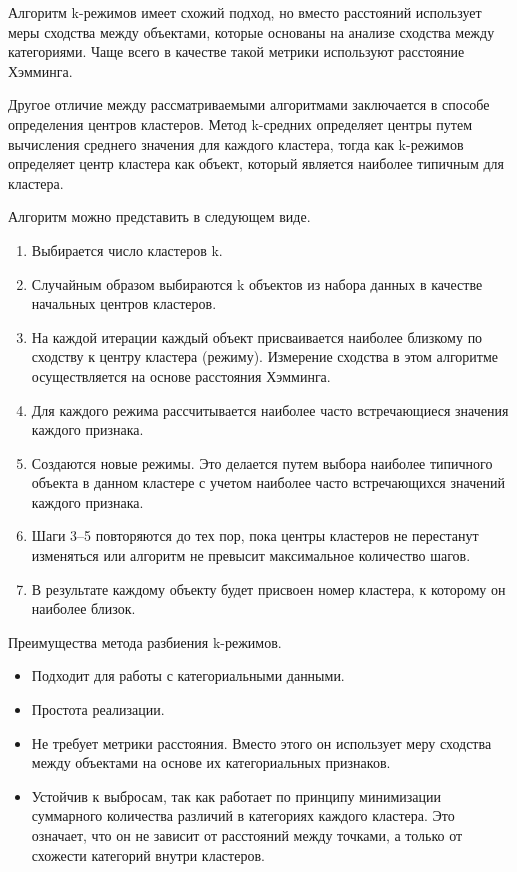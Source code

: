 Алгоритм k-режимов имеет схожий подход, но вместо расстояний использует меры сходства между объектами, которые основаны на анализе сходства между категориями. Чаще всего в качестве такой метрики используют расстояние Хэмминга.

Другое отличие между рассматриваемыми алгоритмами заключается в способе определения центров кластеров. Метод k-средних определяет центры путем вычисления среднего значения для каждого кластера, тогда как k-режимов определяет центр кластера как объект, который является наиболее типичным для кластера.

Алгоритм можно представить в следующем виде.

\begin{enumerate}
    \item Выбирается число кластеров k.
    \item Случайным образом выбираются k объектов из набора данных в качестве начальных центров кластеров.
    \item На каждой итерации каждый объект присваивается наиболее близкому по сходству к центру кластера (режиму). Измерение сходства в этом алгоритме осуществляется на основе расстояния Хэмминга.
    \item Для каждого режима рассчитывается наиболее часто встречающиеся значения каждого признака.
    \item Создаются новые режимы. Это делается путем выбора наиболее типичного объекта в данном кластере с учетом наиболее часто встречающихся значений каждого признака.
    \item Шаги 3--5 повторяются до тех пор, пока центры кластеров не перестанут изменяться или алгоритм не превысит максимальное количество шагов.
    \item В результате каждому объекту будет присвоен номер кластера, к которому он наиболее близок.
\end{enumerate}


Преимущества метода разбиения k-режимов.

\begin{itemize}
    \item Подходит для работы с категориальными данными.
    \item Простота реализации.
    \item Не требует метрики расстояния. Вместо этого он использует меру сходства между объектами на основе их категориальных признаков.
    \item Устойчив к выбросам, так как работает по принципу минимизации суммарного количества различий в категориях каждого кластера. Это означает, что он не зависит от расстояний между точками, а только от схожести категорий внутри кластеров. 
\end{itemize}

